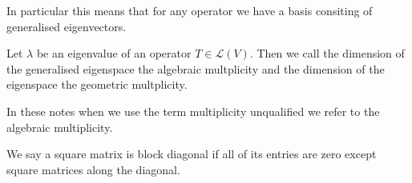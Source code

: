 \documentclass[]{article}
\begin{document}
In particular this means that for any operator we have a basis consiting of generalised eigenvectors. 

\begin{defi} 
		Let $\lambda$ be an eigenvalue of an operator $T \in \mathcal{L}(V)$. Then we call the dimension of the generalised eigenspace the algebraic multplicity and the dimension of the eigenspace the geometric multplicity. 

		In these notes when we use the term multiplicity unqualified we refer to the algebraic multiplicity.
\end{defi}

\begin{defi} 
	We say a square matrix is block diagonal if all of its entries are zero except square matrices along the diagonal.
\end{defi}
\end{document}
